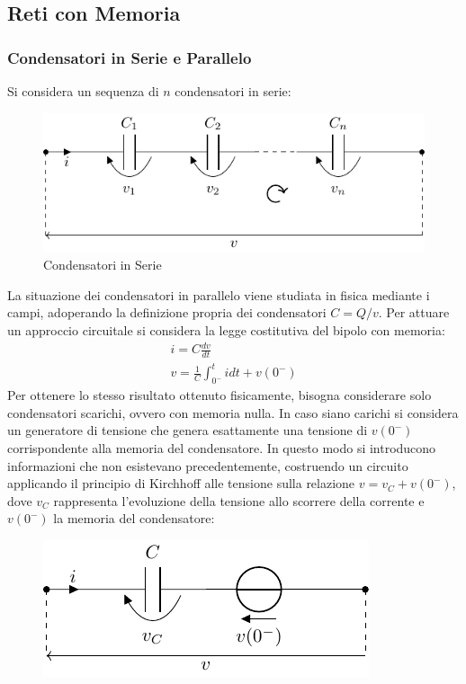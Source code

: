 \documentclass{article}
\numberwithin{equation}{subsection}
\begin{document}
\subsection{Reti con Memoria}

\subsubsection{Condensatori in Serie e Parallelo}

Si considera un sequenza di $n$ condensatori in serie:

\begin{figure}[H]%
    \centering
    \includegraphics{condensatore-serie.pdf}%
    \caption{Condensatori in Serie}
    \label{fig:condensatore-serie}
\end{figure}

La situazione dei condensatori in parallelo viene studiata in fisica mediante i campi, adoperando la definizione propria dei condensatori $C=Q/v$. Per attuare un approccio 
circuitale si considera la legge costitutiva del bipolo con memoria:
\begin{gather*}
    i=C\displaystyle\frac{dv}{dt}\\
    v=\displaystyle\frac{1}{C}\int_{0^-}^tidt+v(0^-)
\end{gather*}
Per ottenere lo stesso risultato ottenuto fisicamente, bisogna considerare solo condensatori scarichi, ovvero con memoria nulla. In caso siano carichi si considera un 
generatore di tensione che genera esattamente una tensione di $v(0^-)$ corrispondente alla memoria del condensatore. In questo modo si introducono informazioni che non 
esistevano precedentemente, costruendo un circuito applicando il principio di Kirchhoff alle tensione sulla relazione $v=v_C+v(0^-)$, dove $v_C$ rappresenta l'evoluzione 
della tensione allo scorrere della corrente e $v(0^-)$ la memoria del condensatore:

\begin{figure}[H]%
    \centering
    \includegraphics{condensatore-memoria.pdf}%
    \label{fig:condensatore-memoria}
\end{figure}
\end{document}
